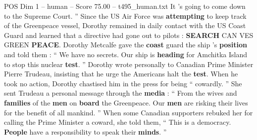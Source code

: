 \begin{textsample}{POS Dim 1 – human – Score 75.00 – t495\_human.txt}
It ’s going to come down to the Supreme Court. ” Since the US Air Force was \textbf{attempting} to keep track of the Greenpeace vessel, Dorothy remained in daily contact with the US Coast Guard and learned that a directive had gone out to pilots : \textbf{SEARCH} CAN VES GREEN \textbf{PEACE}.
Dorothy Metcalfe gave the \textbf{coast} guard the ship ’s \textbf{position} and told them : “ We have no secrets.
Our ship is \textbf{heading} for Amchitka Island to stop this nuclear \textbf{test}. ” Dorothy wrote personally to Canadian Prime Minister Pierre Trudeau, insisting that he urge the Americans halt the \textbf{test}.
When he took no action, Dorothy chastised him in the press for being “ cowardly. ” She sent Trudeau a personal message through the \textbf{media} : “ From the wives and \textbf{families} of the \textbf{men} on \textbf{board} the Greenpeace.
Our \textbf{men} are risking their lives for the benefit of all mankind. ” When some Canadian supporters rebuked her for calling the Prime Minister a coward, she told them, “ This is a democracy. \textbf{People} have a responsibility to speak their \textbf{minds}. ”

\end{textsample}
